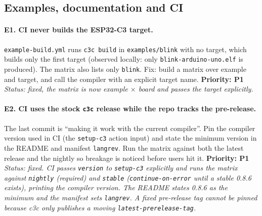 \documentclass[11pt,a4paper]{article}
\newcommand{\pkg}[1]{\texttt{#1}}
\newcommand{\prio}[1]{\textbf{Priority: #1}}
\begin{document}
\subsection{Examples, documentation and CI}

\paragraph{E1. CI never builds the ESP32-C3 target.}
\pkg{example-build.yml} runs \pkg{c3c build} in \pkg{examples/blink} with no target, which builds
only the first target (observed locally: only \pkg{blink-arduino-uno.elf} is produced). The matrix also
lists only \pkg{blink}. Fix: build a matrix over example and target, and call the compiler with an explicit target
name. \prio{P1}
\textit{Status: fixed, the matrix is now example $\times$ board and passes the target explicitly.}

\paragraph{E2. CI uses the stock \pkg{c3c} release while the repo tracks the pre-release.}
The last commit is ``making it work with the current compiler''. Pin the compiler version used in
CI (the \pkg{setup-c3} action input) and state the minimum version in the README and manifest
\pkg{langrev}. Run the matrix against both the latest release and the nightly so breakage is
noticed before users hit it. \prio{P1}
\textit{Status: fixed. CI passes \pkg{version} to \pkg{setup-c3} explicitly and runs the matrix against \pkg{nightly} (required) and \pkg{stable} (\pkg{continue-on-error} until a stable 0.8.6 exists), printing the compiler version. The README states 0.8.6 as the minimum and the manifest sets \pkg{langrev}. A fixed pre-release tag cannot be pinned because c3c only publishes a moving \pkg{latest-prerelease-tag}.}
\end{document}
